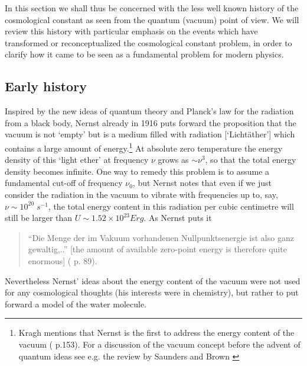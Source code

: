 \documentclass[12pt]{article}
\def\ss{\subsection}
\begin{document}
In this section we shall thus be concerned with the less well known
history of the cosmological constant as seen from the quantum (vacuum)
point of view.  We will review this history with particular emphasis
on the events which have transformed or reconceptualized the
cosmological constant problem, in order to clarify how it came 
to be seen as a fundamental problem for modern physics.


\ss{Early history}

Inspired by the new ideas of quantum theory and Planck's law for
the radiation from a black body, Nernst already in 1916
\cite{nernst16} puts forward the proposition that the vacuum is
not `empty' but is a medium filled with radiation
[`Licht\"{a}ther'] which contains a large amount of
energy.\footnote{Kragh mentions that Nernst is the first to
address the energy content of the vacuum (\cite{kragh96} p.153).
For a discussion of the vacuum concept before the advent of
quantum ideas see e.g. the review by Saunders and Brown
\cite{saunders91}} At absolute zero temperature the energy density
of this `light ether' at frequency $\nu$ grows as $\sim \nu^3$, so
that the total energy density becomes infinite. One way to remedy
this problem is to assume a fundamental cut-off of frequency
$\nu_0$, but Nernst notes that even if we just consider the
radiation in the vacuum to vibrate with frequencies up to, say,
$\nu \sim 10^{20} \; s^{-1}$, the total energy content in this
radiation per cubic centimetre will still be larger than $ U \sim
1.52 \times 10^{23} Erg $. As Nernst puts it 
\begin{quote}
``Die Menge der im Vakuum vorhandenen Nullpunktsenergie ist
also ganz gewaltig,..'' [the amount of available zero-point energy is
therefore quite enormous] (\cite{nernst16} p. 89).  
\end{quote}
Nevertheless
Nernst' ideas about the energy content of the vacuum were not
used for any cosmological thoughts (his interests were in chemistry),
but rather to put forward a model of the water molecule.
\end{document}
